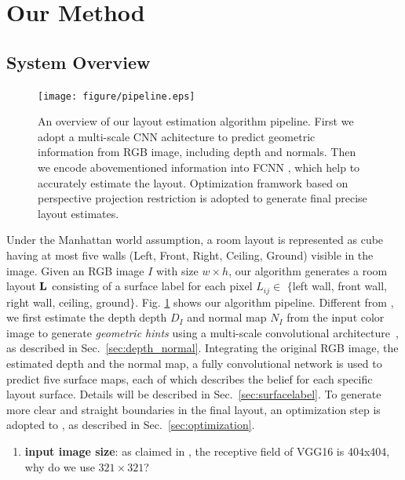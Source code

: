 \section{Our Method}
\label{sec:Meth}


\subsection{System Overview}
\label{subsection:overview}

\begin{figure}[!ht]
	\centering
	\texttt{[image: figure/pipeline.eps]}
	\caption{An overview of our layout estimation algorithm pipeline. First we adopt a multi-scale CNN achitecture to predict geometric information from RGB image, including depth and normals. Then we encode abovementioned information into FCNN , which help to accurately estimate the layout. Optimization framwork based on perspective projection restriction is adopted to generate final precise layout estimates.}
	\label{fig:pipeline}
\end{figure}

Under the Manhattan world assumption, a room layout is represented as cube having at most five walls (Left, Front, Right, Ceiling, Ground) visible in the image. 
%
Given an RGB image $I$ with  size $w\times h$, our algorithm generates a room layout $\mathbf{L}$ consisting of a surface label for each pixel $L_{ij}\in $ $\{$left wall, front wall, right wall, ceiling, ground$\}$. 
Fig. \ref{fig:pipeline} shows our algorithm pipeline. 
Different from \cite{dasgupta2016delay}, we first estimate the depth depth $D_{I}$ and normal map $N_{I}$ from the input color image to generate \emph{geometric hints} using a multi-scale convolutional architecture~\cite{eigen2015predicting}, as described in Sec.~\ref{sec:depth_normal}.
Integrating the original RGB image, the estimated depth and the normal map, a fully convolutional network is used to predict five surface maps, each of which describes the belief for each specific layout surface. Details will be described in Sec.~\ref{sec:surfacelabel}.
To generate more clear and straight boundaries in the final layout, an optimization step is adopted to , as described in Sec.~\ref{sec:optimization}.



\begin{enumerate}
	\item \textbf{input image size}: as claimed in \cite{ren2016three}, the receptive field of VGG16 is 404x404, why do we use $321\times 321$?

\end{enumerate}
 

